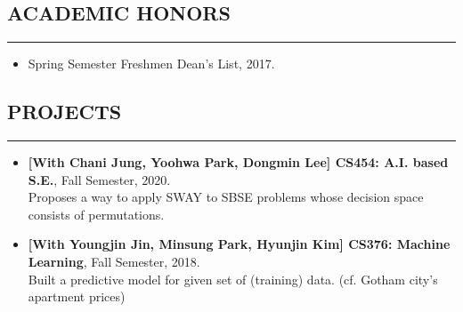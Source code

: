 \documentclass[10pt,a4]{article}
\begin{document}
\begin{small}
%
%	
%
%


\subsection*{ACADEMIC HONORS}
\hrule
\vspace{0.2cm}
\begin{itemize}

\item Spring Semester Freshmen Dean's List, 2017.

\end{itemize}

\pagestyle{fancy}
\lhead{\textcolor{gray}{\it Junghyun Lee}}
\fancyfoot[C]{}

\subsection*{PROJECTS}
\hrule
\vspace{0.2cm}
\begin{itemize}

\item {\bf [With Chani Jung, Yoohwa Park, Dongmin Lee] CS454: A.I. based S.E.}, Fall Semester, 2020. \\
Proposes a way to apply SWAY to SBSE problems whose decision space consists of permutations.

\item {\bf [With Youngjin Jin, Minsung Park, Hyunjin Kim] CS376: Machine Learning}, Fall Semester, 2018. \\
 Built a predictive model for given set of (training) data. (cf. Gotham city's apartment prices) 


\end{itemize}
\end{small}
\end{document}
